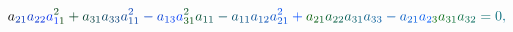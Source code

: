 \documentclass[12pt]{article}
\begin{document}
\begin{displaymath}
{a} _ { \mathcolor[RGB]{0,45,165}{2} \mathcolor[RGB]{0,45,180}{1} } \mathcolor[RGB]{0,45,195}{a} _ { \mathcolor[RGB]{0,45,210}{2} \mathcolor[RGB]{0,45,225}{2} } \mathcolor[RGB]{0,45,240}{a} _ { \mathcolor[RGB]{0,45,255}{1} \mathcolor[RGB]{0,60,0}{1} } ^ { \mathcolor[RGB]{0,60,15}{2} } \mathcolor[RGB]{0,60,30}{+} \mathcolor[RGB]{0,60,45}{a} _ { \mathcolor[RGB]{0,60,60}{3} \mathcolor[RGB]{0,60,75}{1} } \mathcolor[RGB]{0,60,90}{a} _ { \mathcolor[RGB]{0,60,105}{3} \mathcolor[RGB]{0,60,120}{3} } \mathcolor[RGB]{0,60,135}{a} _ { \mathcolor[RGB]{0,60,150}{1} \mathcolor[RGB]{0,60,165}{1} } ^ { \mathcolor[RGB]{0,60,180}{2} } \mathcolor[RGB]{0,60,195}{-} \mathcolor[RGB]{0,60,210}{a} _ { \mathcolor[RGB]{0,60,225}{1} \mathcolor[RGB]{0,60,240}{3} } \mathcolor[RGB]{0,60,255}{a} _ { \mathcolor[RGB]{0,75,0}{3} \mathcolor[RGB]{0,75,15}{1} } ^ { \mathcolor[RGB]{0,75,30}{2} } \mathcolor[RGB]{0,75,45}{a} _ { \mathcolor[RGB]{0,75,60}{1} \mathcolor[RGB]{0,75,75}{1} } \mathcolor[RGB]{0,75,90}{-} \mathcolor[RGB]{0,75,105}{a} _ { \mathcolor[RGB]{0,75,120}{1} \mathcolor[RGB]{0,75,135}{1} } \mathcolor[RGB]{0,75,150}{a} _ { \mathcolor[RGB]{0,75,165}{1} \mathcolor[RGB]{0,75,180}{2} } \mathcolor[RGB]{0,75,195}{a} _ { \mathcolor[RGB]{0,75,210}{2} \mathcolor[RGB]{0,75,225}{1} } ^ { \mathcolor[RGB]{0,75,240}{2} } \mathcolor[RGB]{0,75,255}{+} \mathcolor[RGB]{0,90,0}{a} _ { \mathcolor[RGB]{0,90,15}{2} \mathcolor[RGB]{0,90,30}{1} } \mathcolor[RGB]{0,90,45}{a} _ { \mathcolor[RGB]{0,90,60}{2} \mathcolor[RGB]{0,90,75}{2} } \mathcolor[RGB]{0,90,90}{a} _ { \mathcolor[RGB]{0,90,105}{3} \mathcolor[RGB]{0,90,120}{1} } \mathcolor[RGB]{0,90,135}{a} _ { \mathcolor[RGB]{0,90,150}{3} \mathcolor[RGB]{0,90,165}{3} } \mathcolor[RGB]{0,90,180}{-} \mathcolor[RGB]{0,90,195}{a} _ { \mathcolor[RGB]{0,90,210}{2} \mathcolor[RGB]{0,90,225}{1} } \mathcolor[RGB]{0,90,240}{a} _ { \mathcolor[RGB]{0,90,255}{2} \mathcolor[RGB]{0,105,0}{3} } \mathcolor[RGB]{0,105,15}{a} _ { \mathcolor[RGB]{0,105,30}{3} \mathcolor[RGB]{0,105,45}{1} } \mathcolor[RGB]{0,105,60}{a} _ { \mathcolor[RGB]{0,105,75}{3} \mathcolor[RGB]{0,105,90}{2} } \mathcolor[RGB]{0,105,105}{=} \mathcolor[RGB]{0,105,120}{0} \mathcolor[RGB]{0,105,135}{,} \mathcolor[RGB]{0,105,150}{\,
}
\end{displaymath}
\end{document}
